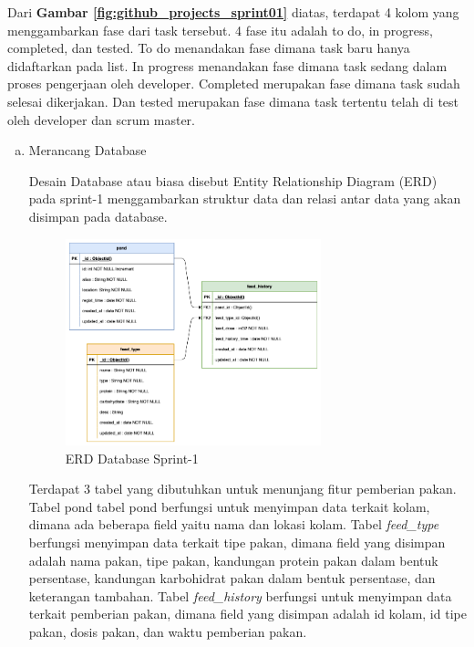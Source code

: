 	Dari \textbf{Gambar \ref{fig:github_projects_sprint01}} diatas, terdapat 4 kolom yang menggambarkan fase dari task tersebut. 4 fase itu adalah to do, in progress, completed, dan tested. To do menandakan fase dimana task baru hanya didaftarkan pada list. In progress menandakan fase dimana task sedang dalam proses pengerjaan oleh developer. Completed merupakan fase dimana task sudah selesai dikerjakan. Dan tested merupakan fase dimana task tertentu telah di test oleh developer dan scrum master.
	
\begin{enumerate}[a).]

	\item{Merancang Database}
	
		Desain Database atau biasa disebut Entity Relationship Diagram (ERD) pada sprint-1 menggambarkan struktur data dan relasi antar data yang akan disimpan pada database. 
	
		\begin{figure}[H]
			\centering
			\includegraphics[width=0.7\textwidth]{gambar/Sprint01/diagram database/database.png}
			\caption{ERD Database Sprint-1}
			\label{fig:erd_database_sprint01}
		\end{figure}
		
		Terdapat 3 tabel yang dibutuhkan untuk menunjang fitur pemberian pakan. Tabel pond tabel pond berfungsi untuk menyimpan data terkait kolam, dimana ada beberapa field yaitu nama dan lokasi kolam. Tabel \textit{feed\_type} berfungsi menyimpan data terkait tipe pakan, dimana field yang disimpan adalah nama pakan, tipe pakan, kandungan protein pakan dalam bentuk persentase, kandungan karbohidrat pakan dalam bentuk persentase, dan keterangan tambahan. Tabel \textit{feed\_history} berfungsi untuk menyimpan data terkait pemberian pakan, dimana field yang disimpan adalah id kolam, id tipe pakan, dosis pakan, dan waktu pemberian pakan.
		

\end{enumerate}
